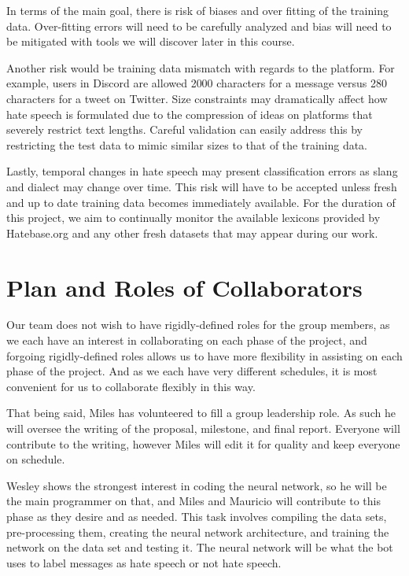 \documentclass[conference]{sig-alternate-05-2015}
\begin{document}
In terms of the main goal, there is risk of biases and over fitting of the training data.  Over-fitting errors will need to be carefully analyzed and bias will need to be mitigated with tools we will discover later in this course.

Another risk would be training data mismatch with regards to the platform.  For example, users in Discord are allowed 2000 characters for a message versus 280 characters for a tweet on Twitter.  Size constraints may dramatically affect how hate speech is formulated due to the compression of ideas on platforms that severely restrict text lengths.  Careful validation can easily address this by restricting the test data to mimic similar sizes to that of the training data.

Lastly, temporal changes in hate speech may present classification errors as slang and dialect may change over time.  This risk will have to be accepted unless fresh and up to date training data becomes immediately available.  For the duration of this project, we aim to continually monitor the available lexicons provided by Hatebase.org and any other fresh datasets that may appear during our work.

\section{Plan and Roles of Collaborators}

Our team does not wish to have rigidly-defined roles for the group members, as we each have an interest in collaborating on each phase of the project, and forgoing rigidly-defined roles allows us to have more flexibility in assisting on each phase of the project. And as we each have very different schedules, it is most convenient for us to collaborate flexibly in this way.

That being said, Miles has volunteered to fill a group leadership role. As such he will oversee the writing of the proposal, milestone, and final report. Everyone will contribute to the writing, however Miles will edit it for quality and keep everyone on schedule.

Wesley shows the strongest interest in coding the neural network, so he will be the main programmer on that, and Miles and Mauricio will contribute to this phase as they desire and as needed. This task involves compiling the data sets, pre-processing them, creating the neural network architecture, and training the network on the data set and testing it. The neural network will be what the bot uses to label messages as hate speech or not hate speech.
\end{document}
